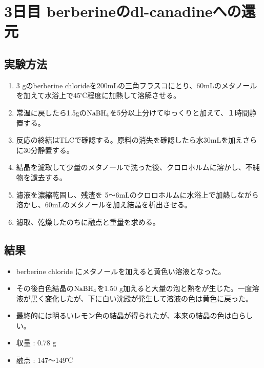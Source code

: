 \documentclass[a4paper,papersize,dvipdfmx]{jsarticle}
\begin{document}
\section*{3日目 berberineのdl-canadineへの還元}
\subsection*{実験方法}
\begin{enumerate}
\item 3 gのberberine chlorideを200mLの三角フラスコにとり、60mLのメタノールを加えて水浴上で45℃程度に加熱して溶解させる。
\item 常温に戻したら1.5gの$\rm NaBH_4$を5分以上分けてゆっくりと加えて、１時間静置する。
\item 反応の終結はTLCで確認する。原料の消失を確認したら水30mLを加えさらに30分静置する。
\item 結晶を濾取して少量のメタノールで洗った後、クロロホルムに溶かし、不純物を濾去する。
\item 濾液を濃縮乾固し、残渣を 5〜6mLのクロロホルムに水浴上で加熱しながら溶かし、60mLのメタノールを加え結晶を析出させる。
\item 濾取、乾燥したのちに融点と重量を求める。
\end{enumerate}
\subsection*{結果}
\begin{itemize}
\item berberine chloride にメタノールを加えると黄色い溶液となった。
\item その後白色結晶の$\rm NaBH_4$を1.50 g加えると大量の泡と熱をが生じた。一度溶液が黒く変化したが、下に白い沈殿が発生して溶液の色は黄色に戻った。
\item 最終的には明るいレモン色の結晶が得られたが、本来の結晶の色は白らしい。
\item 収量 : 0.78 g
\item 融点 : 147〜149℃

\end{itemize}
\end{document}

